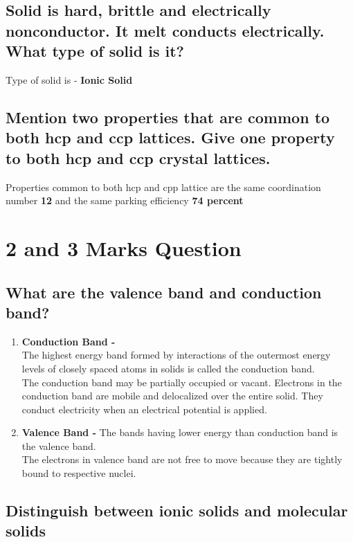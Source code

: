 \documentclass{article}
\begin{document}
   \subsection{Solid is hard, brittle and electrically nonconductor.
   It melt conducts electrically. What type of solid is it?}

   Type of solid is - \textbf{Ionic Solid}

   \subsection{Mention two properties that are common to both hcp and
   ccp lattices. Give one property to both hcp and ccp crystal 
   lattices.}

   Properties common to both hcp and cpp lattice are the same
   coordination number \textbf{12} and the same parking efficiency 
   \textbf{74 percent}

   \section{2 and 3 Marks Question}
   \subsection{What are the valence band and conduction band?}
   
   \begin{enumerate}
	\item \textbf{Conduction Band -} \\ 
	The highest energy band formed by interactions of the outermost
	energy levels of closely spaced atoms in solids is called the
	conduction band.\\
	The conduction band may be partially occupied or vacant.
	Electrons in the conduction band are mobile and delocalized
	over the entire solid. They conduct electricity when an 
	electrical potential is applied.

	\item \textbf{Valence Band -}
	The bands having lower energy than conduction band is the
	valence band.\\
	The electrons in valence band are not free to move because
	they are tightly bound to respective nuclei.
   \end{enumerate}

   \subsection{Distinguish between ionic solids and molecular solids}
\end{document}
